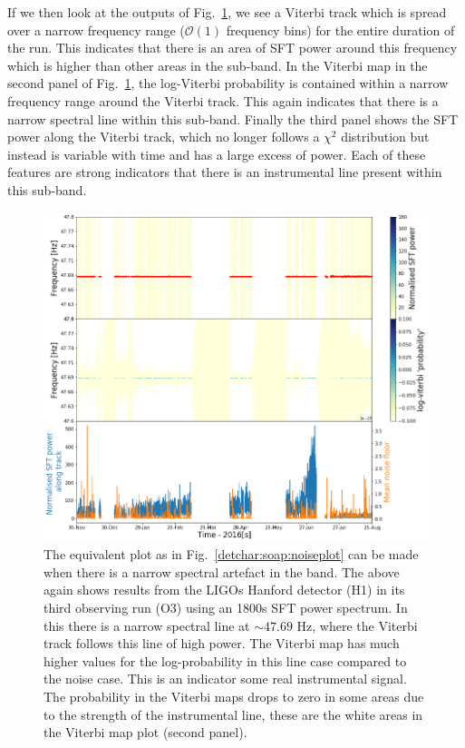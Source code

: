 If we then look at the outputs of Fig.~\ref{detchar:soap:lineplot}, we see a Viterbi track which is spread over a narrow frequency range ($\mathcal{O}(1)$ frequency bins) for the entire duration of the run.  
This indicates that there is an area of \gls{SFT} power around this frequency which is higher than other areas in the sub-band.
In the Viterbi map in the second panel of Fig.~\ref{detchar:soap:lineplot}, the log-Viterbi probability is contained within a narrow frequency range around the Viterbi track.
This again indicates that there is a narrow spectral line within this sub-band.
Finally the third panel shows the \gls{SFT} power along the Viterbi track, which no longer follows a $\chi^2$ distribution but instead is variable with time and has a large excess of power.
Each of these features are strong indicators that there is an instrumental line
present within this sub-band.
%
\begin{figure}[hpt]
	\centering
	\includegraphics[width=\textwidth]{C6_detchar/track_F47_6_47_8_linenarrow.png}
	\caption[Example SOAP output for string narrow instrumental line.]{The
equivalent plot as in Fig.~\ref{detchar:soap:noiseplot} can be made when there
is a narrow spectral artefact in the band. The above again shows results from
the \glspl{LIGO} Hanford detector (H1) in its third observing run (O3) using
an 1800s \gls{SFT} power spectrum. In this there is a narrow spectral line at
$\sim 47.69$ Hz, where the Viterbi track follows this line of high power. The
Viterbi map has much higher values for the log-probability in this line case
compared to the noise case. This is an indicator some
real instrumental signal. The
probability in the Viterbi maps drops to zero in some areas due to the strength
of the instrumental line, these are the white areas in the Viterbi map plot
(second panel). } \label{detchar:soap:lineplot}

\end{figure}
%


